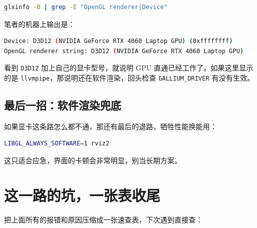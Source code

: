 \documentclass[12pt,a4paper]{ctexbook}
\begin{document}
\begin{lstlisting}[language=bash,title={查看当前使用的 OpenGL 渲染器}]
glxinfo -B | grep -E "OpenGL renderer|Device"
\end{lstlisting}

笔者的机器上输出是：

\begin{lstlisting}[language=bash,title={硬件加速已生效}]
    Device: D3D12 (NVIDIA GeForce RTX 4060 Laptop GPU) (0xffffffff)
OpenGL renderer string: D3D12 (NVIDIA GeForce RTX 4060 Laptop GPU)
\end{lstlisting}

看到 \verb|D3D12| 加上自己的显卡型号，就说明 GPU 直通已经工作了。如果这里显示的是 \verb|llvmpipe|，那说明还在软件渲染，回头检查 \verb|GALLIUM_DRIVER| 有没有生效。

\subsection{最后一招：软件渲染兜底}

如果显卡这条路怎么都不通，那还有最后的退路，牺牲性能换能用：

\begin{lstlisting}[language=bash,title={强制软件渲染}]
LIBGL_ALWAYS_SOFTWARE=1 rviz2
\end{lstlisting}

这只适合应急，界面的卡顿会非常明显，别当长期方案。

\section{这一路的坑，一张表收尾}

把上面所有的报错和原因压缩成一张速查表，下次遇到直接查：
\end{document}
